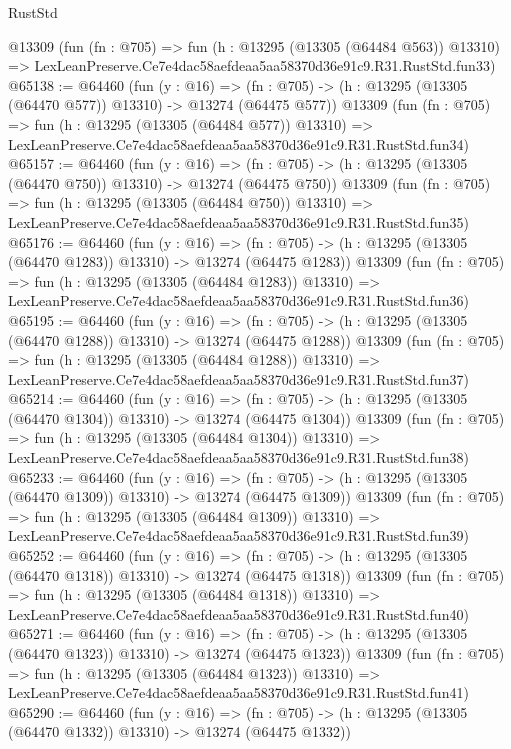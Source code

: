 \begin{lexlean}{RustStd}
\begin{coremodule}
    @13309
    (fun (fn : @705) =>
    fun (h : @13295 (@13305 (@64484 @563)) @13310) =>
    LexLeanPreserve.Ce7e4dac58aefdeaa5aa58370d36e91c9.R31.RustStd.fun33)
@65138 := @64460
    (fun (y : @16) =>
    (fn : @705) -> (h : @13295 (@13305 (@64470 @577)) @13310) -> @13274 (@64475 @577))
    @13309
    (fun (fn : @705) =>
    fun (h : @13295 (@13305 (@64484 @577)) @13310) =>
    LexLeanPreserve.Ce7e4dac58aefdeaa5aa58370d36e91c9.R31.RustStd.fun34)
@65157 := @64460
    (fun (y : @16) =>
    (fn : @705) -> (h : @13295 (@13305 (@64470 @750)) @13310) -> @13274 (@64475 @750))
    @13309
    (fun (fn : @705) =>
    fun (h : @13295 (@13305 (@64484 @750)) @13310) =>
    LexLeanPreserve.Ce7e4dac58aefdeaa5aa58370d36e91c9.R31.RustStd.fun35)
@65176 := @64460
    (fun (y : @16) =>
    (fn : @705) -> (h : @13295 (@13305 (@64470 @1283)) @13310) -> @13274 (@64475 @1283))
    @13309
    (fun (fn : @705) =>
    fun (h : @13295 (@13305 (@64484 @1283)) @13310) =>
    LexLeanPreserve.Ce7e4dac58aefdeaa5aa58370d36e91c9.R31.RustStd.fun36)
@65195 := @64460
    (fun (y : @16) =>
    (fn : @705) -> (h : @13295 (@13305 (@64470 @1288)) @13310) -> @13274 (@64475 @1288))
    @13309
    (fun (fn : @705) =>
    fun (h : @13295 (@13305 (@64484 @1288)) @13310) =>
    LexLeanPreserve.Ce7e4dac58aefdeaa5aa58370d36e91c9.R31.RustStd.fun37)
@65214 := @64460
    (fun (y : @16) =>
    (fn : @705) -> (h : @13295 (@13305 (@64470 @1304)) @13310) -> @13274 (@64475 @1304))
    @13309
    (fun (fn : @705) =>
    fun (h : @13295 (@13305 (@64484 @1304)) @13310) =>
    LexLeanPreserve.Ce7e4dac58aefdeaa5aa58370d36e91c9.R31.RustStd.fun38)
@65233 := @64460
    (fun (y : @16) =>
    (fn : @705) -> (h : @13295 (@13305 (@64470 @1309)) @13310) -> @13274 (@64475 @1309))
    @13309
    (fun (fn : @705) =>
    fun (h : @13295 (@13305 (@64484 @1309)) @13310) =>
    LexLeanPreserve.Ce7e4dac58aefdeaa5aa58370d36e91c9.R31.RustStd.fun39)
@65252 := @64460
    (fun (y : @16) =>
    (fn : @705) -> (h : @13295 (@13305 (@64470 @1318)) @13310) -> @13274 (@64475 @1318))
    @13309
    (fun (fn : @705) =>
    fun (h : @13295 (@13305 (@64484 @1318)) @13310) =>
    LexLeanPreserve.Ce7e4dac58aefdeaa5aa58370d36e91c9.R31.RustStd.fun40)
@65271 := @64460
    (fun (y : @16) =>
    (fn : @705) -> (h : @13295 (@13305 (@64470 @1323)) @13310) -> @13274 (@64475 @1323))
    @13309
    (fun (fn : @705) =>
    fun (h : @13295 (@13305 (@64484 @1323)) @13310) =>
    LexLeanPreserve.Ce7e4dac58aefdeaa5aa58370d36e91c9.R31.RustStd.fun41)
@65290 := @64460
    (fun (y : @16) =>
    (fn : @705) -> (h : @13295 (@13305 (@64470 @1332)) @13310) -> @13274 (@64475 @1332))

\end{coremodule}
\end{lexlean}
